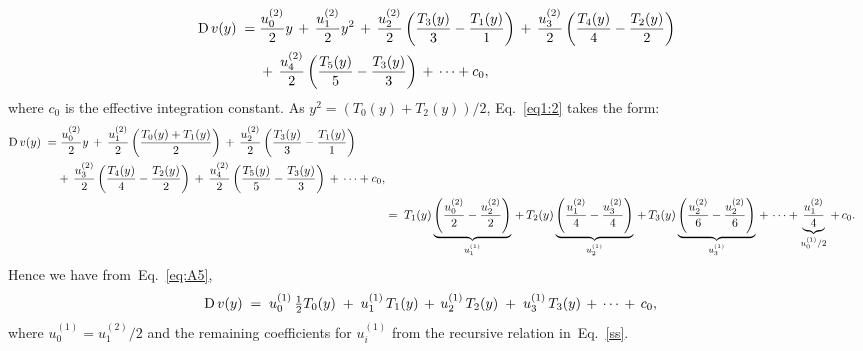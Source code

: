 \documentclass[%
secnumarabic,%
 amssymb, amsmath,%
 aps,prf,superscriptaddress,longbibliography
frontmatterverbose,
]{revtex4-2}
\begin{document}
\begin{align}\label{eq1:2}
  \begin{split}
    \mathrm D\,v(y) \;=&\; \frac{u^{(2)}_0}{2}y \,+ \, \frac{u^{(2)}_1}{2}y^2 \,+\,\frac{u^{(2)}_2}{2}\left(\frac{T_3(y)}{3} - \frac{T_1(y)}{1}\right) \,+\,\frac{u^{(2)}_3}{2}\left(\frac{T_4(y)}{4} - \frac{T_2(y)}{2}\right)\,\\
    &\;+\,\frac{u^{(2)}_4}{2}\left(\frac{T_5(y)}{5} - \frac{T_3(y)}{3}\right)\,+\, \cdots + c_0,
  \end{split}
\end{align}
where $c_0$ is the effective integration constant.
As $y^2 = (T_0(y)+T_2(y))/2$, Eq.~\eqref{eq1:2} takes the form:
\begin{align}
  \begin{split}
  \mathrm D\,v(y)\;=&\; \frac{u^{(2)}_0}{2}y \,+\, \frac{u^{(2)}_1}{2} \left(\frac{T_0(y) + T_1(y)}{2}\right) \,+\,\frac{u^{(2)}_2}{2}\left(\frac{T_3(y)}{3} - \frac{T_1(y)}{1}\right) \,\\&+\,\frac{u^{(2)}_3}{2}\left(\frac{T_4(y)}{4} - \frac{T_2(y)}{2}\right)\,+\,\frac{u^{(2)}_4}{2}\left(\frac{T_5(y)}{5} - \frac{T_3(y)}{3}\right)\,+\, \cdots + c_0,
\end{split} \\
  &=\; T_1(y)\underbrace{\left(\frac{u^{(2)}_0}{2} - \frac{u^{(2)}_2}{2}\right)}_{u^{(1)}_1} \,+\,T_2(y)\underbrace{\left(\frac{u^{(2)}_1}{4} - \frac{u^{(2)}_3}{4} \right)}_{u^{(1)}_2} \,+\,T_3(y)\underbrace{\left(\frac{u^{(2)}_2}{6} - \frac{u^{(2)}_2}{6}\right)}_{u^{(1)}_3} \,+\,\cdots + \underbrace{\frac{u^{(2)}_1}{4}}_{u^{(1)}_0/2} \,+\, c_0.\label{eq:A5}
\end{align}
Hence we have from~Eq.~\eqref{eq:A5},
\begin{align}
  \mathrm D\, v(y) \;&=\; u^{(1)}_0 \,\tfrac{1}{2}T_0(y) \;+\; u^{(1)}_1\,T_1(y) \,+\, u^{(1)}_2\,T_2(y) \;+\; u^{(1)}_3\,T_3(y) \,+\, \cdots \,+\, c_0,
\end{align}
where $u^{(1)}_0 = u^{(2)}_1/2$ and the remaining coefficients for $u^{(1)}_i$ from the recursive relation in~Eq.~\eqref{ss}.

\newpage

\singlespacing

\end{document}
